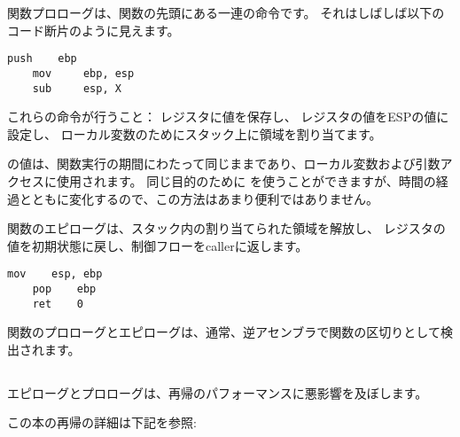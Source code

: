 \label{sec:prologepilog}

関数プロローグは、関数の先頭にある一連の命令です。 それはしばしば以下のコード断片のように見えます。

\begin{lstlisting}[style=customasmx86]
    push    ebp
    mov     ebp, esp
    sub     esp, X
\end{lstlisting}

これらの命令が行うこと： \EBP レジスタに値を保存し、
\EBP レジスタの値をESPの値に設定し、
ローカル変数のためにスタック上に領域を割り当てます。

\EBP の値は、関数実行の期間にわたって同じままであり、ローカル変数および引数アクセスに使用されます。 
同じ目的のために \ESP を使うことができますが、時間の経過とともに変化するので、この方法はあまり便利ではありません。

関数のエピローグは、スタック内の割り当てられた領域を解放し、 \EBP レジスタの値を初期状態に戻し、制御フローを\gls{caller}に返します。

\begin{lstlisting}[style=customasmx86]
    mov    esp, ebp
    pop    ebp
    ret    0
\end{lstlisting}

関数のプロローグとエピローグは、通常、逆アセンブラで関数の区切りとして検出されます。

\subsection{\Recursion}

\myindex{\Recursion}
エピローグとプロローグは、再帰のパフォーマンスに悪影響を及ぼします。

この本の再帰の詳細は下記を参照: 
